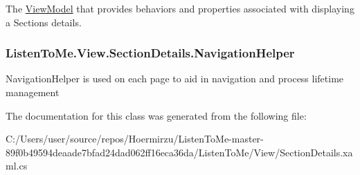 The \hyperlink{namespace_listen_to_me_1_1_view_model}{View\+Model} that provides behaviors and properties associated with displaying a Section\textquotesingle{}s details. 

\subsubsection[{\texorpdfstring{Navigation\+Helper}{NavigationHelper}}]{ Listen\+To\+Me.\+View.\+Section\+Details.\+Navigation\+Helper\hspace{0.3cm}{\ttfamily [get]}}\hypertarget{class_listen_to_me_1_1_view_1_1_section_details_a4712dad29872447f222e969ba956759e}{}\label{class_listen_to_me_1_1_view_1_1_section_details_a4712dad29872447f222e969ba956759e}


Navigation\+Helper is used on each page to aid in navigation and process lifetime management 



The documentation for this class was generated from the following file\+:\begin{DoxyCompactItemize}
\item 
C\+:/\+Users/user/source/repos/\+Hoermirzu/\+Listen\+To\+Me-\/master-\/89f0b49594deaade7bfad24dad062ff16eca36da/\+Listen\+To\+Me/\+View/Section\+Details.\+xaml.\+cs\end{DoxyCompactItemize}
